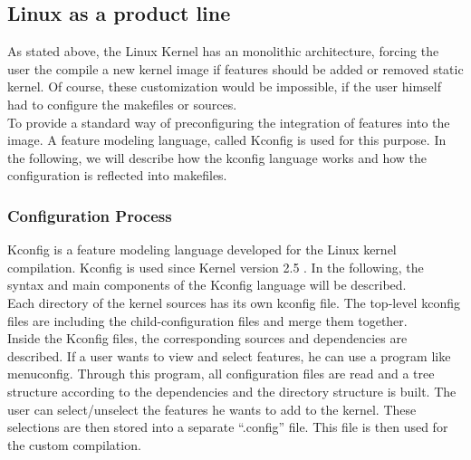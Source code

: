 \documentclass{sig-alternate-05-2015}
\begin{document}
\subsection{Linux as a product line}
As stated above, the Linux Kernel has an monolithic architecture, forcing the user the compile a new kernel image if features should be added or removed static kernel. Of course, these customization would be impossible, if the user himself had to configure the makefiles or sources.\\
To provide a standard way of preconfiguring the integration of features into the image. A feature modeling language, called Kconfig \cite{kconfig} is used for this purpose. In the following, we will describe how the kconfig language works and how the configuration is reflected into makefiles.
\subsubsection{Configuration Process}
Kconfig is a feature modeling language developed for the Linux kernel compilation. Kconfig is used since Kernel version 2.5 \cite{mauerer2010professional}. In the following, the syntax and main components of the Kconfig language will be described.\\ Each directory of the kernel sources has its own kconfig file. The top-level kconfig files are including the child-configuration files and merge them together.\\ Inside the Kconfig files, the corresponding sources and dependencies are described. If a user wants to view and select features, he can use a program like menuconfig. Through this program, all configuration files are read and a tree structure according to the dependencies and the directory structure is built. The user can select/unselect the features he wants to add to the kernel. These selections are then stored into a separate ``.config'' file. This file is then used for the custom compilation.\par 
\end{document}
